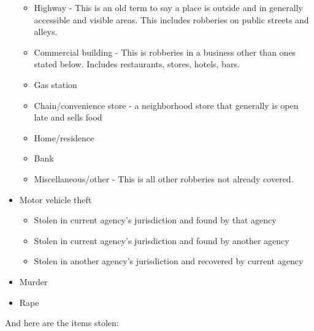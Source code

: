 \documentclass[
]{krantz}
\providecommand{\tightlist}{%
  \setlength{\itemsep}{0pt}\setlength{\parskip}{0pt}}
\begin{document}
\begin{itemize}
  \begin{itemize}
  \tightlist
  \item
    Highway - This is an old term to say a place is outside
    and in generally accessible and visible areas. This
    includes robberies on public streets and alleys.
  \item
    Commercial building - This is robberies in a business
    other than ones stated below. Includes restaurants,
    stores, hotels, bars.
  \item
    Gas station
  \item
    Chain/convenience store - a neighborhood store that
    generally is open late and sells food
  \item
    Home/residence
  \item
    Bank
  \item
    Miscellaneous/other - This is all other robberies not
    already covered.
  \end{itemize}
\item
  Motor vehicle theft

  \begin{itemize}
  \tightlist
  \item
    Stolen in current agency's jurisdiction and found by
    that agency
  \item
    Stolen in current agency's jurisdiction and found by
    another agency
  \item
    Stolen in another agency's jurisdiction and recovered by
    current agency
  \end{itemize}
\item
  Murder
\item
  Rape
\end{itemize}

And here are the items stolen:
\end{document}
